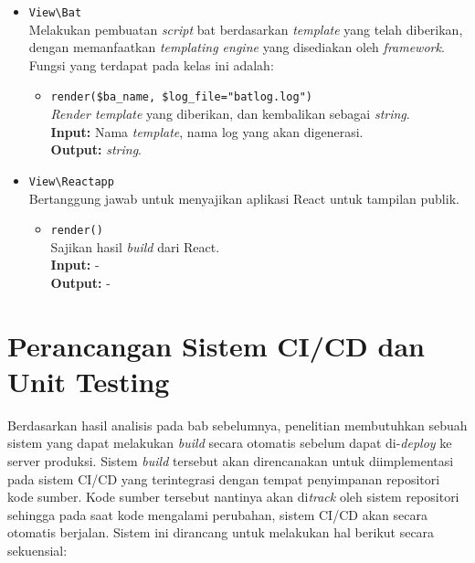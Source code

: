 \begin{itemize}
        \item \texttt{View\textbackslash Bat} \\
            Melakukan pembuatan \textit{script} bat berdasarkan
            \textit{template} yang telah diberikan, dengan memanfaatkan
            \textit{templating engine} yang disediakan oleh \textit{framework}.
            Fungsi yang terdapat pada kelas ini adalah:
            \begin{itemize}
                \item \texttt{render(\$ba\_name, \$log\_file="batlog.log")} \\
                    \textit{Render template} yang diberikan, dan kembalikan
                    sebagai \textit{string}. \\
                    \textbf{Input:} Nama \textit{template}, nama log yang akan
                    digenerasi.\\
                    \textbf{Output:} \textit{string}.
            \end{itemize}
        
        \item \texttt{View\textbackslash Reactapp} \\
            Bertanggung jawab untuk menyajikan aplikasi React untuk tampilan
            publik.
            \begin{itemize}
                \item \texttt{render()} \\
                    Sajikan hasil \textit{build} dari React. \\
                    \textbf{Input:} -\\
                    \textbf{Output:} -
            \end{itemize}
    \end{itemize}


\section{Perancangan Sistem CI/CD dan Unit Testing}
    Berdasarkan hasil analisis pada bab sebelumnya, penelitian membutuhkan
    sebuah sistem yang dapat melakukan \textit{build} secara otomatis sebelum
    dapat di-\textit{deploy} ke server produksi. Sistem \textit{build} tersebut
    akan direncanakan untuk diimplementasi pada sistem CI/CD yang terintegrasi
    dengan tempat penyimpanan repositori kode sumber. Kode sumber tersebut
    nantinya akan di\textit{track} oleh sistem repositori sehingga pada saat
    kode mengalami perubahan, sistem CI/CD akan secara otomatis berjalan. Sistem
    ini dirancang untuk melakukan hal berikut secara sekuensial:
    
